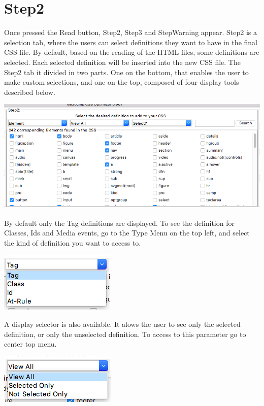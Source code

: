\documentclass[10pt,letterpaper]{article}
\begin{document}
\section {Step2}
Once pressed the Read button, Step2, Step3 and StepWarning appear. Step2 is a selection tab, where the users can select definitions they want to have in the final CSS file. By default, based on the reading of the HTML files, some definitions are selected. Each selected definition will be inserted into the new CSS file. The Step2 tab it divided in two parts. One on the bottom, that enables the user to make custom selections, and one on the top, composed of four display tools described below.
\begin{center} 
\includegraphics[scale=0.4]{step2}
\end{center}
\newpage
By default only the Tag definitions are displayed. To see the definition for Classes, Ids and Media events, go to the Type Menu on the top left, and select the kind of definition you want to access to.
\begin{center} 
\includegraphics[scale=0.6]{typeselect}
\end{center}
A display selector is also available. It alows the user to see only the selected definition, or only the unselected definition. To access to this parameter go to center top menu.
\begin{center} 
\includegraphics[scale=0.6]{viewselect}
\end{center}
\end{document}
